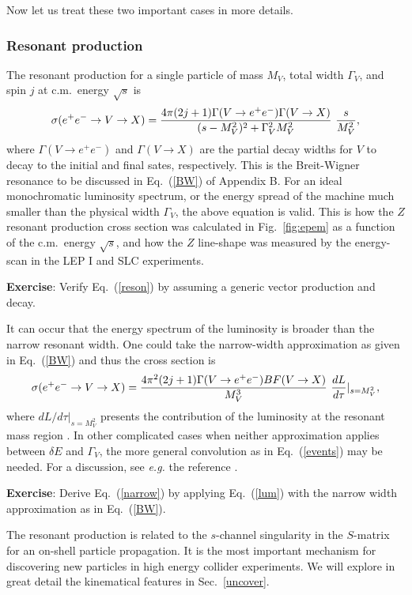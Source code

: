 \documentclass[12pt,prd,aps,floats,preprintnumbers,preprint,superscriptaddress,floatfix,nofootinbib]{revtex4}
\def\epem{e^+e^-}
\def\bea{\begin{eqnarray}}
\def\eea{\end{eqnarray}}
\begin{document}
Now let us treat these two important cases in more details.

\subsubsection{Resonant production}
The resonant production for a single particle of mass $M_V$, total width $\Gamma_V$, 
and spin $j$ at c.m.~energy $\sqrt s$ is 
\bea
\sigma(e^+e^-\to V \to X) 
= \frac{4\pi(2j+1)\Gamma(V\to \epem)\Gamma(V\to X)} 
{(s-M^2_V)^2 + \Gamma_V^2 M_V^2} \ {s\over M_V^2},
\label{reson}
\eea 
where $\Gamma(V\to \epem)$ and $\Gamma(V\to X)$ are the partial decay widths
for $V$ to decay to the initial and final sates, respectively. 
This is the Breit-Wigner resonance to be discussed in Eq.~(\ref{BW}) of 
Appendix B. 
For an ideal monochromatic luminosity spectrum,
or the energy spread of the machine much smaller than the physical width $\Gamma_V$,
the above equation is valid.  This  is how the $Z$ 
resonant production cross section was calculated in Fig.~\ref{fig:epem}
as a function of the c.m.~energy $\sqrt s$, and
how the $Z$ line-shape was measured by the energy-scan 
in the LEP I and SLC experiments. 

{
\vskip 0.2cm
\noindent
{\bf Exercise}: Verify Eq.~(\ref{reson}) by assuming a generic vector production and decay.
\vskip 0.2cm
}

It can occur that the energy spectrum of the luminosity is broader than the narrow
resonant width. One could take the narrow-width approximation as given in
Eq.~(\ref{BW}) and thus the cross section is 
\bea
\sigma(e^+e^-\to V \to X) 
= \frac{4\pi^2 (2j+1)\Gamma(V\to \epem) BF(V\to X)} { M_V^3} \ 
{dL\over d\tau}|_{s=M_V^2},
\label{narrow}
\eea 
where $dL/ d\tau|_{s=M_V^2}$ presents the  contribution
of the luminosity at the resonant mass region . 
In other complicated cases when neither approximation applies between
$\delta E$ and $\Gamma_V$, the more general convolution 
as in Eq.~(\ref{events})
may be needed. For a discussion, see {\it e.g.} the reference \cite{muon}.

{
\vskip 0.2cm
\noindent
{\bf Exercise}: Derive Eq.~(\ref{narrow}) by applying Eq.~(\ref{lum}) with the narrow 
 width approximation as in Eq.~(\ref{BW}).
\vskip 0.2cm
}

The resonant production is related to the $s$-channel singularity in the 
$S$-matrix for an on-shell  particle propagation. 
It is the most important mechanism for discovering
new particles in high energy collider experiments. We will explore in
great detail the kinematical features in Sec.~\ref{uncover}.
\end{document}
